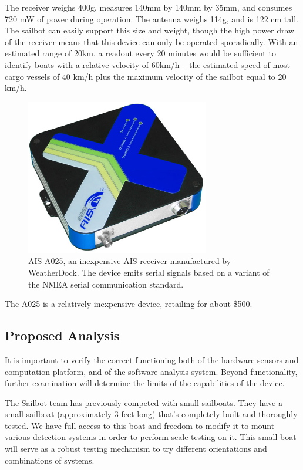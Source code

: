 The receiver weighs 400g, measures 140mm by 140mm by 35mm, and consumes 720 mW of power during operation. The antenna weighs 114g, and is 122 cm tall. The sailbot can easily support this size and weight, though the high power draw of the receiver means that this device can only be operated sporadically. With an estimated range of 20km, a readout every 20 minutes would be sufficient to identify boats with a relative velocity of 60km/h -- the estimated speed of most cargo vessels of 40 km/h plus the maximum velocity of the sailbot equal to 20 km/h.

\begin{figure}
\includegraphics[width=80mm,natwidth=540,natheight=459]{"./image/ais-a025"}
\caption[AIS A025 by WeatherDock.]{\label{fig:easyais-a025}AIS A025, an inexpensive AIS receiver manufactured by WeatherDock. The device emits serial signals based on a variant of the NMEA serial communication standard.}
\end{figure}

The A025 is a relatively inexpensive device, retailing for about \$500. 


\subsection{\label{sec:method:proposed-analysis}Proposed Analysis}
It is important to verify the correct functioning both of the hardware sensors and computation platform, and of the software analysis system. Beyond functionality, further examination will determine the limits of the capabilities of the device.

The Sailbot team has previously competed with small sailboats. They have a small sailboat (approximately 3 feet long) that's completely built and thoroughly tested. We have full access to this boat and freedom to modify it to mount various detection systems in order to perform scale testing on it. This small boat will serve as a robust testing mechanism to try different orientations and combinations of systems.

